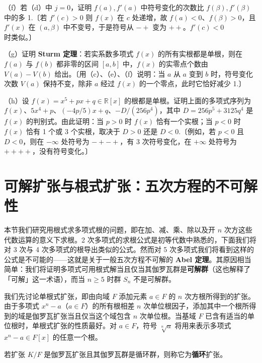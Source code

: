 \begin{enumerate}
（f）若（d）中 \(j = 0\)，证明 \(f(a), f'(a)\) 中符号变化的次数比 \(f(\beta), f'(\beta)\) 中的多 1.〔若 \(f'(c) > 0\) 则 \(f(x)\) 在 \(c\) 处递增，故 \(f(a) < 0\)、\(f(\beta) > 0\)，且 \(f'(x)\) 在 \((a, \beta)\) 中不变号，于是符号从 \(-+\) 变为 \(++\)。\(f'(c) < 0\) 时类似。〕

（g）证明 \textbf{Sturm 定理}：若实系数多项式 \(f(x)\) 的所有实根都是单根，则在 \(f(a)\) 与 \(f(b)\) 都非零的区间 \([a, b]\) 中，\(f(x)\) 的实零点个数由 \(V(a)-V(b)\) 给出。〔用（c）、（e）、（f）说明：当 \(a\) 从 \(a\) 变到 \(b\) 时，符号变化次数 \(V(a)\) 保持不变，除非 \(a\) 经过 \(f(x)\) 的一个零点，此时它恰好减少 1.〕

（h）设 \(f(x) = x^5+px+q \in \mathbb{R}[x]\) 的根都是单根。证明上面的多项式序列为 \(f(x)\)、\(5x^4+p\)、\((-4p/5)x+q\)、\(-D/(256p^4)\)，其中 \(D = 256p^5+3125q^4\) 是 \(f(x)\) 的判别式。由此证明：当 \(p > 0\) 时 \(f(x)\) 恰有一个实根；当 \(p < 0\) 时 \(f(x)\) 恰有 1 个或 3 个实根，取决于 \(D > 0\) 还是 \(D < 0\).〔例如，若 \(p < 0\) 且 \(D < 0\)，则在 \(-\infty\) 处符号为 \(-+-+\)，有 3 次符号变化，在 \(+\infty\) 处符号为 \(++++\)，没有符号变化。〕
\end{enumerate}

\section{可解扩张与根式扩张：五次方程的不可解性}

本节我们研究用根式求多项式根的问题，即在加、减、乘、除以及开 \(n\) 次方这些代数运算的意义下求根。2 次多项式的求根公式是初等代数中熟悉的，下面我们将对 3 次与 4 次多项式的根导出类似的公式。然而对 5 次多项式我们将看到这样的公式是不可能的——这就是关于一般五次方程不可解的 \textbf{Abel 定理}。其原因相当简单：我们将证明多项式可用根式解当且仅当其伽罗瓦群是\textbf{可解群}（这也解释了「可解」这一术语），而当 \(n \geq 5\) 时群 \(S_n\) 不是可解群。

我们先讨论单根式扩张，即由向域 \(F\) 添加元素 \(a \in F\) 的 \(n\) 次方根所得到的扩张。由于多项式 \(x^n-a\)（\(a \in F\)）的所有根相差 \(n\) 次单位根因子，添加其中一个根所得到的域是伽罗瓦扩张当且仅当这个域包含 \(n\) 次单位根。当基域 \(F\) 已含有适当的单位根时，单根式扩张的性质最好。对 \(a \in F\)，符号 \(\sqrt[n]{a}\) 将用来表示多项式 \(x^n-a \in F[x]\) 的任意一个根。

\begin{definition}
若扩张 \(K/F\) 是伽罗瓦扩张且其伽罗瓦群是循环群，则称它为\textbf{循环}扩张。
\end{definition}

